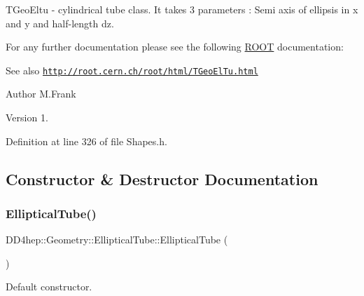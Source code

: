 T\+Geo\+Eltu -\/ cylindrical tube class. It takes 3 parameters \+: Semi axis of ellipsis in x and y and half-\/length dz.

For any further documentation please see the following \hyperlink{namespace_r_o_o_t}{R\+O\+OT} documentation\+: \begin{DoxySeeAlso}{See also}
\href{http://root.cern.ch/root/html/TGeoElTu.html}{\tt http\+://root.\+cern.\+ch/root/html/\+T\+Geo\+El\+Tu.\+html}
\end{DoxySeeAlso}
\begin{DoxyAuthor}{Author}
M.\+Frank 
\end{DoxyAuthor}
\begin{DoxyVersion}{Version}
1. 
\end{DoxyVersion}


Definition at line 326 of file Shapes.\+h.



\subsection{Constructor \& Destructor Documentation}
\hypertarget{class_d_d4hep_1_1_geometry_1_1_elliptical_tube_aed5afac54a520885363aa5e11da24a42}{}\label{class_d_d4hep_1_1_geometry_1_1_elliptical_tube_aed5afac54a520885363aa5e11da24a42} 
\subsubsection{\texorpdfstring{Elliptical\+Tube()}{EllipticalTube()}\hspace{0.1cm}{\footnotesize\ttfamily [1/6]}}
{\footnotesize\ttfamily D\+D4hep\+::\+Geometry\+::\+Elliptical\+Tube\+::\+Elliptical\+Tube (\begin{DoxyParamCaption}{ }\end{DoxyParamCaption})\hspace{0.3cm}{\ttfamily [default]}}



Default constructor. 

\hypertarget{class_d_d4hep_1_1_geometry_1_1_elliptical_tube_a804d28e0c14220a3040545f3d84cbf53}{}\label{class_d_d4hep_1_1_geometry_1_1_elliptical_tube_a804d28e0c14220a3040545f3d84cbf53} 
